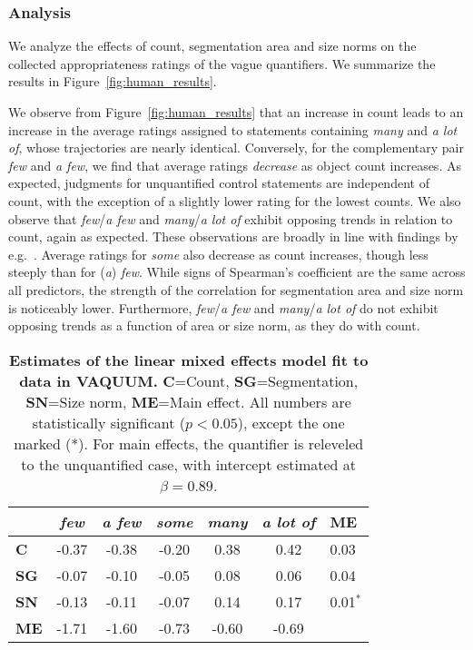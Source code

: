 \subsubsection{Analysis}\label{sec:human_analysis}
We analyze the effects of count, segmentation area and size norms on the collected appropriateness ratings of the vague quantifiers. 
We summarize the results in Figure~\ref{fig:human_results}.

We observe from Figure~\ref{fig:human_results} that an increase in count leads to an increase in the average ratings assigned to statements containing \textit{many} and \textit{a lot of}, whose trajectories are nearly identical. 
Conversely, for the complementary pair \textit{few} and \textit{a few}, we find that average ratings \emph{decrease} as object count increases. As expected, judgments for unquantified control statements are independent of count, with the exception of a slightly lower rating for the lowest counts. We also observe that \textit{few}/\textit{a few} and \textit{many}/\textit{{a lot of}} exhibit opposing trends in relation to count, again as expected.
These observations are broadly in line with findings by e.g.\ \citet{coventry2010-space}.
Average ratings for \textit{some} also decrease as count increases, though less steeply than for (\textit{a}) \textit{few}.
While signs of Spearman's coefficient are the same across all predictors, the strength of the correlation for segmentation area and size norm is noticeably lower. 
Furthermore, \textit{few}/\textit{a few} and \textit{many}/\textit{{a lot of}} do not exhibit opposing trends as a function of area or size norm, as they do with count.


\begin{table}
    \centering
    \setlength{\tabcolsep}{5pt}
    \small
    \begin{tabular}{l|ccccc|l}
        \toprule
        & \textbf{\textit{few}} & \textbf{\textit{a few}} & \textbf{\textit{some}} & \textbf{\textit{many}} & \textbf{\textit{a lot of}} & \textbf{ME}\\\midrule
        \textbf{C} & -0.37 & -0.38 & -0.20 & 0.38 & 0.42 & 0.03\\
        \textbf{SG} & -0.07 & -0.10 & -0.05 & 0.08 & 0.06 & 0.04 \\
        \textbf{SN} & -0.13 & -0.11 & -0.07 & 0.14 & 0.17 & 0.01$^*$ \\\midrule
        \textbf{ME} & -1.71 & -1.60 & -0.73 & -0.60 & -0.69
            \\\bottomrule
    \end{tabular}
    \caption{\textbf{Estimates of the linear mixed effects model fit to data in VAQUUM.} \textbf{C}=Count, \textbf{SG}=Segmentation, \textbf{SN}=Size norm, \textbf{ME}=Main effect.  All numbers are statistically significant ($p < 0.05$), except the one marked (*). For main effects, the quantifier is releveled to the unquantified case, with intercept estimated at $\beta=0.89$.}
    \label{tab:lmm_humans}
\end{table}

